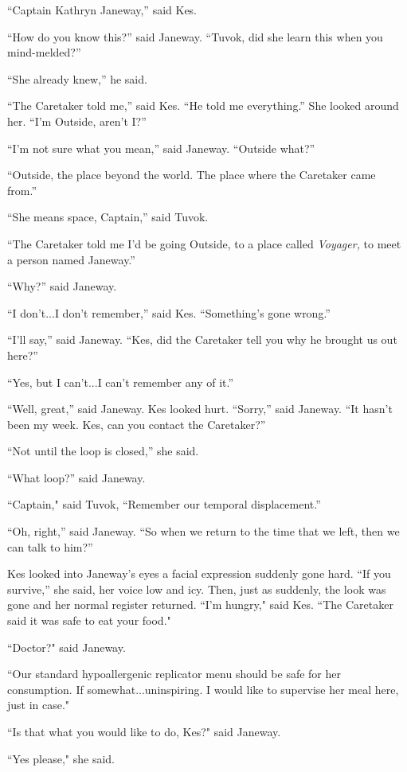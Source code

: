 \documentclass[twoside,letterpaper,12pt]{memoir}
\begin{document}
``Captain Kathryn Janeway,” said Kes. 

``How do you know this?” said Janeway. ``Tuvok, did she learn this when you mind-melded?” 

``She already knew,” he said. 

``The Caretaker told me,” said Kes. ``He told me everything.” She looked around her. ``I’m Outside, aren’t I?” 

``I’m not sure what you mean,” said Janeway. ``Outside what?” 

``Outside, the place beyond the world. The place where the Caretaker came from.” 

``She means space, Captain,” said Tuvok. 

``The Caretaker told me I’d be going Outside, to a place called \textit{Voyager, }to meet a person named Janeway.” 

``Why?” said Janeway. 

``I don’t...I don’t remember,” said Kes. ``Something’s gone wrong.” 

``I’ll say,” said Janeway. ``Kes, did the Caretaker tell you why he brought us out here?” 

``Yes, but I can’t...I can’t remember any of it.” 

``Well, great,” said Janeway. Kes looked hurt. ``Sorry,” said Janeway. ``It hasn’t been my week. Kes, can you contact the Caretaker?” 

``Not until the loop is closed,” she said. 

``What loop?” said Janeway. 

``Captain," said Tuvok, ``Remember our temporal displacement.” 

``Oh, right,” said Janeway. ``So when we return to the time that we left, then we can talk to him?” 

Kes looked into Janeway’s eyes a facial expression suddenly gone hard. ``If you survive,” she said, her voice low and icy. Then, just as suddenly, the look was gone and her normal register returned. ``I'm hungry," said Kes. ``The Caretaker said it was safe to eat your food." 

``Doctor?" said Janeway. 

``Our standard hypoallergenic replicator menu should be safe for her consumption. If somewhat...uninspiring. I would like to supervise her meal here, just in case." 

``Is that what you would like to do, Kes?" said Janeway. 

``Yes please," she said. 
\end{document}

